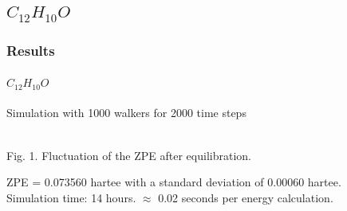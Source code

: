 \documentclass{beamer}
\begin{document}
\subsection{$C_{12} H_{10} O$}
\begin{frame}
\frametitle{Results}
\framesubtitle{$C_{12} H_{10} O$}
Simulation with 1000 walkers for 2000 time steps
\begin{center}
\\
Fig. 1. Fluctuation of the ZPE after equilibration.
\end{center}
ZPE = 0.073560 hartee with a standard deviation of 0.00060 hartee.\\
Simulation time: 14 hours. $\approx$ 0.02 seconds per energy calculation.


\end{frame}
\end{document}
